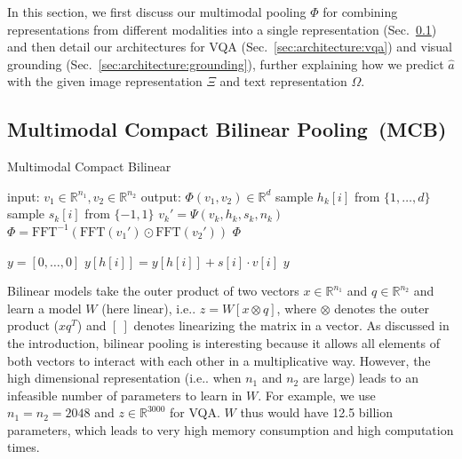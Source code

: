 \documentclass[11pt,letterpaper]{article}
\makeatletter
\DeclareRobustCommand\onedot{\futurelet\@let@token\@onedot}
\def\@onedot{\ifx\@let@token.\else.\null\fi\xspace}
\def\ie{i.e\onedot} \def\Ie{I.e\onedot}
\DeclareRobustCommand{\secref}[1]{Sec.~\ref{#1}}
\makeatother
\begin{document}
In this section, we first discuss our multimodal pooling $\Phi$ for combining representations from different modalities into a single representation (\secref{sec:approach:mcb}) and then detail our architectures for VQA (\secref{sec:architecture:vqa}) and visual grounding (\secref{sec:architecture:grounding}), further explaining how we predict $\hat{a}$ with the given image representation $\Xi$ and text representation $\Omega$.

\subsection{Multimodal Compact Bilinear Pooling~(MCB)}
\label{sec:approach:mcb}





\begin{algorithm}
\small
\caption{Multimodal Compact Bilinear}\label{alg:ts}
\begin{algorithmic}[1]
\State input: $v_1 \in \mathbb{R}^{n_1}, v_2 \in \mathbb{R}^{n_2}$
\State output: $\Phi(v_1, v_2) \in \mathbb{R}^d$
\State sample $h_{k}[i]$ from $\{1,\ldots,d\}$
\State sample $s_{k}[i]$ from $\{-1,1\}$
\EndFor
\EndIf
\State $v_k' = \Psi(v_k, h_k, s_k, n_k)$
\EndFor
\State $\Phi = \text{FFT}^{-1}(\text{FFT}(v_1') \odot \text{FFT}(v_2')) $
\State \Return $\Phi$
\EndProcedure

\State $y = [0, \ldots, 0]$
\State $y[h[i]] = y[h[i]] + s[i] \cdot v[i]$
\EndFor
\State \Return $y$
\EndProcedure
\end{algorithmic}
\end{algorithm}
Bilinear models \cite{tenenbaum00nc} take the outer product of two vectors $x \in \mathbb{R}^{n_1}$ and $q \in \mathbb{R}^{n_2}$ and learn a model $W$ (here linear), \ie
$z=W\left[x \otimes q\right]$, 
where  $\otimes$ denotes the outer product ($xq^T$) and $\left[\ \right]$ denotes linearizing the matrix in a vector.
As discussed in the introduction, bilinear pooling is interesting because it allows all elements of both vectors to interact with each other in a multiplicative way. 
However, the high dimensional representation (\ie when $n_1$ and $n_2$ are large) leads to an infeasible number of parameters to learn in $W$. For example, we use $n_1 = n_2 = 2048$ and  $z \in \mathbb{R}^{3000}$ for VQA. $W$ thus would have 12.5 billion parameters, which leads to very high memory consumption and high computation times.
\end{document}
